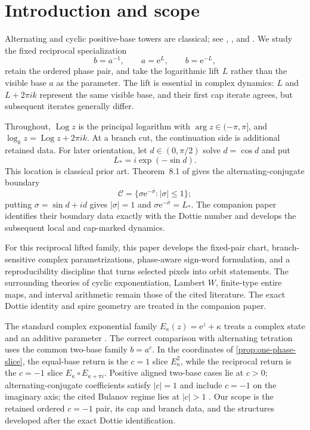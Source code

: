 \documentclass[11pt]{article}
\theoremstyle{definition}
\theoremstyle{remark}
\newcommand{\Logp}{\operatorname{Log}}
\newcommand{\e}{\mathrm e}
\begin{document}
\section{Introduction and scope}

Alternating and cyclic positive-base towers are classical; see \citet{CreutzSternheimer1981}, \citet{BakerRippon1985,BakerRippon1989,BakerRippon1989Composite}, and \citet{Bulanov2001,Bulanov2010}.  We study the fixed reciprocal specialization
\[
  b=a^{-1},\qquad a=\e^L,\qquad b=\e^{-L},
\]
retain the ordered phase pair, and take the logarithmic lift $L$ rather than the visible base $a$ as the parameter.  The lift is essential in complex dynamics: $L$ and $L+2\pi i k$ represent the same visible base, and their first cap iterate agrees, but subsequent iterates generally differ.

Throughout, $\Logp z$ is the principal logarithm with $\arg z\in(-\pi,\pi]$, and $\log_k z=\Logp z+2\pi i k$.  At a branch cut, the continuation side is additional retained data.  For later orientation, let $d\in(0,\pi/2)$ solve $d=\cos d$ and put
\begin{equation}
  L_*=i\exp(-\sin d).
  \label{eq:dottie-Lstar}
\end{equation}
This location is classical prior art.  Theorem~8.1 of \citet{BakerRippon1989Composite} gives the alternating-conjugate boundary
\[
  \mathcal C=\{\sigma\e^{-\bar\sigma}:|\sigma|\le1\};
\]
putting $\sigma=\sin d+id$ gives $|\sigma|=1$ and $\sigma\e^{-\bar\sigma}=L_*$.  The companion paper \citep{NickDottie2026} identifies their boundary data exactly with the Dottie number and develops the subsequent local and cap-marked dynamics.

For this reciprocal lifted family, this paper develops the fixed-pair chart, branch-sensitive complex parametrizations, phase-aware sign-word formulation, and a reproducibility discipline that turns selected pixels into orbit statements.  The surrounding theories of cyclic exponentiation, Lambert $W$, finite-type entire maps, and interval arithmetic remain those of the cited literature.  The exact Dottie identity and spire geometry are treated in the companion paper.

The standard complex exponential family $E_\kappa(z)=\e^z+\kappa$ treats a complex state and an additive parameter \citep{RempeSchleicher2008}.  The correct comparison with alternating tetration uses the common two-base family $b=a^c$.  In the coordinates of \cref{prop:one-phase-slice}, the equal-base return is the $c=1$ slice $E_\kappa^2$, while the reciprocal return is the $c=-1$ slice $E_\kappa\circ E_{\kappa+\pi i}$.  Positive aligned two-base cases lie at $c>0$; alternating-conjugate coefficients satisfy $|c|=1$ and include $c=-1$ on the imaginary axis; the cited Bulanov regime lies at $|c|>1$ \citep{BakerRippon1985,BakerRippon1989Composite,Bulanov2001}.  Our scope is the retained ordered $c=-1$ pair, its cap and branch data, and the structures developed after the exact Dottie identification.
\end{document}
